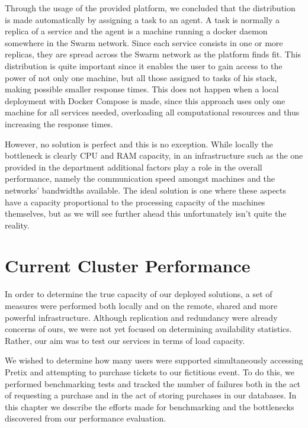 \documentclass[12pt]{article}
\begin{document}
Through the usage of the provided platform, we concluded that the distribution is made automatically by assigning a task to an agent. 
A task is normally a replica of a service and the agent is a machine running a docker daemon somewhere in the Swarm network. 
Since each service consists in one or more replicas, they are spread across the Swarm network as the platform finds fit.
This distribution is quite important since it enables the user to gain access to the power of not only one machine, but all those assigned to tasks of his stack, 
making possible smaller response times. 
This does not happen when a local deployment with Docker Compose is made, since this approach uses only one machine for all services needed, overloading all 
computational resources and thus increasing the response times.

However, no solution is perfect and this is no exception.
While locally the bottleneck is clearly CPU and RAM capacity, in an infrastructure such as the one provided in the department additional factors play a role in 
the overall performance, namely the communication speed amongst machines and the networks' bandwidths available.
The ideal solution is one where these aspects have a capacity proportional to the processing capacity of the machines themselves, but as we will see further 
ahead this unfortunately isn't quite the reality.

\newpage
\section{Current Cluster Performance} \label{performance} %


In order to determine the true capacity of our deployed solutions, a set of measures were performed both locally and on the remote, shared and more powerful 
infrastructure.
Although replication and redundancy were already concerns of ours, we were not yet focused on determining availability statistics.
Rather, our aim was to test our services in terms of load capacity.

We wished to determine how many users were supported simultaneously accessing Pretix and attempting to purchase tickets to our fictitious event.
To do this, we performed benchmarking tests and tracked the number of failures both in the act of requesting a purchase and in the act of storing purchases in 
our databases.
In this chapter we describe the efforts made for benchmarking and the bottlenecks discovered from our performance evaluation.
\end{document}
